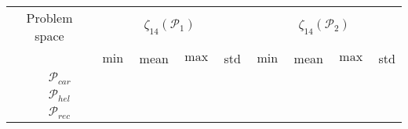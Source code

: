 \begin{tabular}{|ll|rrrr|rrrr|} \hline 
\multicolumn{2}{|c|}{Problem space} & \multicolumn{4}{c|}{$\zeta_{14}(\mathcal{P}_1)$} & \multicolumn{4}{c|}{$\zeta_{14}(\mathcal{P}_2)$}\\
$\quad$&&$\min$&mean&$\max$&std&$\min$&mean&$\max$&std\\ \hline
&$\mathcal{P}_{car}$&&&&&&&& \\
&$\mathcal{P}_{hel} $&&&&&&&& \\
&$\mathcal{P}_{rec} $&&&&&&&& \\
\hline
\end{tabular}
